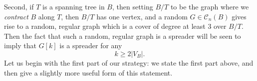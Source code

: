 \documentclass{memo-l}
\theoremstyle{plain}
\newtheorem{lemma}[theorem]{Lemma}
\theoremstyle{definition}
\numberwithin{section}{chapter}
\numberwithin{equation}{chapter}
\newcommand{\from}{\colon}
\theoremstyle{plain}
\theoremstyle{definition}
\newcommand\cC{\mathcal{C}}
\begin{document}
Second, if $T$ is a spanning tree in $B$, then setting $B/T$ to be the
graph where we {\em contract} $B$ along $T$, then $B/T$ has one vertex,
and a random $G\in \cC_n(B)$ gives rise to a random, regular graph
which is a cover of degree at least $3$ over $B/T$.  
Then the fact that such a random,
regular graph is a spreader will be seen to imply that
$G[k]$ is a spreader for any 
$$
k\ge 2|V_B|.
$$
Let us begin with
the first part of our strategy: we state the first part above, and
then give a slightly more useful form of this statement.

\end{document}

